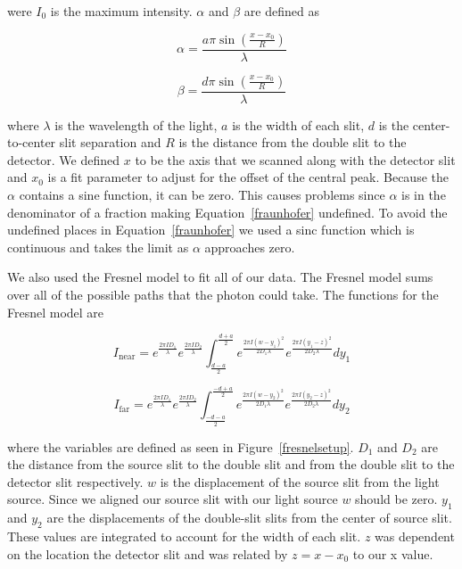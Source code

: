\documentclass[prb,preprint]{revtex4-1}
\begin{document}
were $I_0$ is the maximum intensity. $\alpha$ and $\beta$ are defined as

\begin{equation}
\label{alpha}
\alpha = \frac{a \pi \sin(\frac{x - x_0}{R})}{\lambda}
\end{equation}

\begin{equation}
\label{beta}
\beta = \frac{d \pi \sin(\frac{x - x_0}{R})}{\lambda}
\end{equation}

where $\lambda$ is the wavelength of the light, $a$ is the width of each slit, $d$ is the center-to-center slit separation and $R$ is the distance from the double slit to the detector. We defined $x$ to be the axis that we scanned along with the detector slit and $x_0$ is a fit parameter to adjust for the offset of the central peak.
Because the $\alpha$ contains a sine function, it can be zero. This causes problems since $\alpha$ is in the denominator of a fraction making Equation~\ref{fraunhofer} undefined. To avoid the undefined places in Equation~\ref{fraunhofer} we used a sinc function which is continuous and takes the limit as $\alpha$ approaches zero.

We also used the Fresnel model to fit all of our data. The Fresnel model sums over all of the possible paths that the photon could take. The functions for the Fresnel model are

\begin{equation}
\label{fresnelnear}
I_\text{near} = e^{\frac{2 \pi I D_1}{\lambda}} e^{\frac{2 \pi I D_2}{\lambda}} \int_\frac{d-a}{2}^\frac{d+a}{2} e^{\frac{2 \pi I (w-y_1)^2}{2 D_1 \lambda}} e^{\frac{2 \pi I (y_1-z)^2}{2 D_2 \lambda}} dy_1
\end{equation}

\begin{equation}
\label{fresnelfar}
I_\text{far} = e^{\frac{2 \pi I D_1}{\lambda}} e^{\frac{2 \pi I D_2}{\lambda}} \int_\frac{-d-a}{2}^\frac{-d+a}{2} e^{\frac{2 \pi I (w-y_2)^2}{2 D_1 \lambda}} e^{\frac{2 \pi I (y_2-z)^2}{2 D_2 \lambda}} dy_2
\end{equation}

where the variables are defined as seen in Figure~\ref{fresnelsetup}. $D_1$ and $D_2$ are the distance from the source slit to the double slit and from the double slit to the detector slit respectively. $w$ is the displacement of the source slit from the light source. Since we aligned our source slit with our light source $w$ should be zero. $y_1$ and $y_2$ are the displacements of the double-slit slits from the center of source slit. These values are integrated to account for the width of each slit. $z$ was dependent on the location the detector slit and was related by $z = x - x_0$ to our x value.
\end{document}
